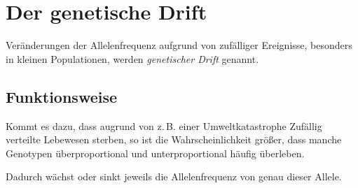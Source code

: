 \documentclass{article}
\begin{document}
\section{Der genetische Drift}
Veränderungen der Allelenfrequenz aufgrund von zufälliger Ereignisse, besonders in kleinen Populationen, werden \emph{genetischer Drift} genannt.
 
\subsection{Funktionsweise} 
Kommt es dazu, dass augrund von z.\,B. einer Umweltkatastrophe Zufällig verteilte Lebewesen sterben, so ist die Wahrscheinlichkeit größer, dass manche Genotypen überproportional und unterproportional häufig überleben. 
 
Dadurch wächst oder sinkt jeweils die Allelenfrequenz von genau dieser Allele. 
\end{document}
